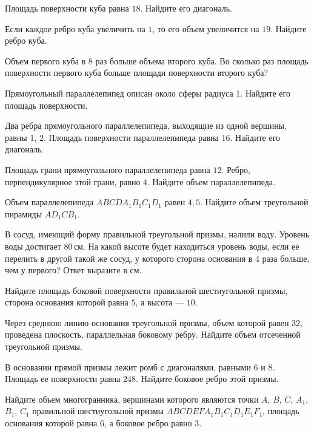 %
%

\begin{class}[number=1]
	\begin{listofex}
		\item Площадь поверхности куба равна \( 18 \). Найдите его диагональ.
		\item Если каждое ребро куба увеличить на \( 1 \), то его объем увеличится на \( 19 \). Найдите ребро куба.
		\item Объем первого куба в \( 8 \) раз больше объема второго куба.
		Во сколько раз площадь поверхности первого куба больше площади поверхности второго куба?
		\item Прямоугольный параллелепипед описан около сферы радиуса \( 1 \). Найдите его площадь поверхности.
		\item Два ребра прямоугольного параллелепипеда, выходящие из одной вершины, равны \( 1 \), \( 2 \).
		Площадь поверхности параллелепипеда равна \( 16 \). Найдите его диагональ.
		\item Площадь грани прямоугольного параллелепипеда равна \( 12 \). Ребро, перпендикулярное этой грани, равно 4. Найдите объем параллелепипеда.
		\item Объем параллелепипеда \( ABCDA_1B_1C_1D_1 \) равен \( 4,5 \). Найдите объем треугольной пирамиды \( AD_1CB_1 \).
		\item В сосуд, имеющий форму правильной треугольной призмы, налили воду. Уровень воды достигает \( 80 \) см. На какой высоте будет находиться уровень воды, если ее перелить в другой такой же сосуд, у которого сторона основания в \( 4 \) раза больше, чем у первого? Ответ выразите в см.
		\item Найдите площадь боковой поверхности правильной шестиугольной призмы, сторона основания которой равна \( 5 \), а высота  --- \( 10 \).
		\item Через среднюю линию основания треугольной призмы, объем которой равен \( 32 \), проведена плоскость, параллельная боковому ребру.
		Найдите объем отсеченной треугольной призмы.
		\item В основании прямой призмы лежит ромб с диагоналями, равными \( 6 \) и \( 8 \). Площадь ее поверхности равна \( 248 \).
		Найдите боковое ребро этой призмы.
		\item Найдите объем многогранника, вершинами которого являются точки \( A \), \( B \), \( C \), \( A_1 \), \( B_1 \), \( C_1 \) правильной шестиугольной призмы \( ABCDEFA_1B_1C_1D_1E_1F_1 \), площадь основания которой равна \( 6 \), а боковое ребро равно \( 3 \).

\end{listofex}
\end{class}
